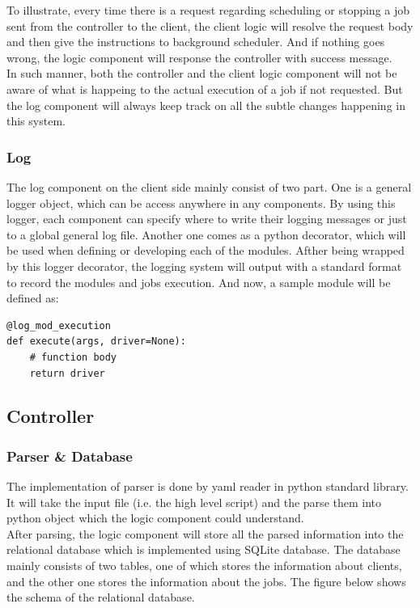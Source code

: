 \documentclass[12pt]{report}
\begin{document}
To illustrate, every time there is a request regarding scheduling or stopping a job sent from the controller to the client, the client logic will resolve the request body and then give the instructions to background scheduler. And if nothing goes wrong, the logic component will response the controller with success message.\\

In such manner, both the controller and the client logic component will not be aware of what is happeing to the actual execution of a job if not requested. But the log component will always keep track on all the subtle changes happening in this system.


\subsubsection{Log}
The log component on the client side mainly consist of two part. One is a general logger object, which can be access anywhere in any components. By using this logger, each component can specify where to write their logging messages or just to a global general log file. Another one comes as a python decorator, which will be used when defining or developing each of the modules. Afther being wrapped by this logger decorator, the logging system will output with a standard format to record the modules and jobs execution. And now, a sample module will be defined as:

\begin{lstlisting}
@log_mod_execution
def execute(args, driver=None):
    # function body
    return driver
\end{lstlisting}

\subsection{Controller}
\subsubsection{Parser \& Database}
The implementation of parser is done by yaml reader in python standard library. It will take the input file (i.e. the high level script) and the parse them into python object which the logic component could understand.\\

After parsing, the logic component will store all the parsed information into the relational database which is implemented using SQLite database. The database mainly consists of two tables, one of which stores the information about clients, and the other one stores the information about the jobs. The figure below shows the schema of the relational database.
\end{document}
